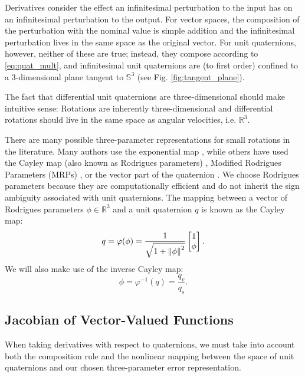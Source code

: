 \documentclass[letterpaper, 10 pt, conference]{ieeeconf}  %
\newcommand{\R}{\mathbb{R}}
\newcommand{\Q}{\mathbb{S}^3}
\begin{document}
        Derivatives consider the effect an infinitesimal perturbation to the input has on
        an infinitesimal perturbation to the output. For vector spaces, the composition
        of the perturbation with the nominal value is simple addition and the
        infinitesimal perturbation lives in the same space as the original vector. For
        unit quaternions, however, neither of these are true; instead, they compose
        according to \eqref{eq:quat_mult}, and infinitesimal unit quaternions are (to
        first order) confined to a 3-dimensional plane tangent to $\Q$ (see Fig.
        \ref{fig:tangent_plane}).

        The fact that differential unit quaternions are three-dimensional should make
        intuitive sense: Rotations are inherently three-dimensional and differential
        rotations should live in the same space as angular velocities, i.e. $\R^3$.
        
        There are many possible three-parameter representations for small rotations in
        the literature. Many authors use the exponential map \cite{Baillieul1978,
        Zefran1998, Lee2008, Saccon2013, Sola2017, Fan2016, watterson2018trajectory},
        while others have used the Cayley map (also known as Rodrigues parameters)
        \cite{Kobilarov2011, Kobilarov2014}, Modified Rodrigues Parameters (MRPs)
        \cite{Terzakis2018}, or the vector part of the quaternion \cite{Fresk2013}.
        We choose Rodrigues parameters \cite{markley2014fundamentals} because they are
        computationally efficient and do not inherit the sign ambiguity associated with
        unit quaternions. The mapping between a vector of Rodrigues parameters $\phi \in
        \R^3$ and a unit quaternion $q$ is known as the Cayley map: \begin{equation}
        \label{eq:cayley}
            q = \varphi(\phi) = \frac{1}{\sqrt{1 + \norm{\phi}^2}} \begin{bmatrix} 1 \\ \phi \end{bmatrix}.
        \end{equation}
        We will also make use of the inverse Cayley map:
        \begin{equation}
            \phi = \varphi^{-1}(q) = \frac{q_v}{q_s}.
        \end{equation}

    \subsection{Jacobian of Vector-Valued Functions}
        When taking derivatives with respect to quaternions, we must take into account
        both the composition rule and the nonlinear mapping between the space of unit
        quaternions and our chosen three-parameter error representation.
\end{document}
